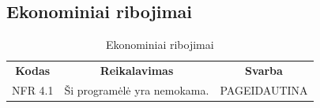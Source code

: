 \documentclass{VUMIFPSkursinis}
\begin{document}
\subsection{Ekonominiai ribojimai}
\begin{center}
	\begin{table}[H]
	\caption{Ekonominiai ribojimai}
	\begin{tabular}{|p{2cm}|p{}|p{}|}
	\hline
	    \rowcolor{lightgray}
		\multicolumn{3}{|c|}{Ekonominiai ribojimai}\\
		
	\hline
		\multicolumn{1}{|c|}{{\bfseries Kodas}}&
		\multicolumn{1}{|c|}{{\bfseries Reikalavimas}}&
		\multicolumn{1}{|c|}{{\bfseries Svarba}}\\
	\hline 	
		\multicolumn{1}{|c|}{NFR 4.1}&
		{Ši programėlė yra nemokama.}&
		\multicolumn{1}{|p{1.5cm}|}{PAGEIDAUTINA}\\	
	
	\hline
	
	
	\end{tabular}
	
	\label{table:Ekonominiairibojimai}
	\end{table}

\end{center}

\pagebreak
\end{document}
